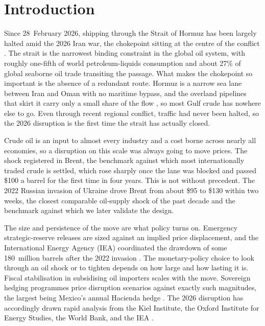 \section{Introduction}
\label{sec:intro}

Since 28~February 2026, shipping through the Strait of Hormuz has been largely halted amid
the 2026 Iran war, the chokepoint sitting at the centre of the conflict
\citep{worldbank2026}. The strait is the narrowest binding constraint in the global
oil system, with roughly one-fifth of world petroleum-liquids consumption
\citep{eia_hormuz2025} and about 27\% of global seaborne oil trade \citep{crs_hormuz2026}
transiting the passage. What makes the
chokepoint so important is the absence of a redundant route. Hormuz is a narrow sea lane
between Iran and Oman with no maritime bypass, and the overland pipelines that skirt it
carry only a small share of the flow \citep{eia_hormuz2025}, so most Gulf crude has nowhere
else to go. Even
through recent regional conflict, traffic had never been halted, so the 2026 disruption is
the first time the strait has actually closed.

Crude oil is an input to almost every industry and a cost borne across nearly all
economies, so a disruption on this scale was always going to move prices. The shock
registered in Brent, the benchmark against which most internationally traded crude is
settled, which rose sharply once the lane was blocked and passed \$100 a barrel for the
first time in four years. This is not without precedent. The 2022 Russian invasion of
Ukraine drove Brent from about \$95 to \$130 within two weeks, the closest comparable
oil-supply shock of the past decade and the benchmark against which we later validate the
design.

The size and persistence of the move are what policy turns on. Emergency
strategic-reserve releases are sized against an implied price displacement, and the
International Energy Agency (IEA) coordinated the drawdown of some 180~million barrels
after the 2022 invasion \citep{iea2022release}. The monetary-policy choice to look through
an oil shock or to tighten depends on how large and how lasting it is. Fiscal
stabilisation in subsidising oil importers scales with the move. Sovereign hedging
programmes price disruption scenarios against exactly such magnitudes, the largest being
Mexico's annual Hacienda hedge \citep{jfi2023mexico}. The 2026 disruption has accordingly
drawn rapid analysis from the Kiel Institute, the Oxford Institute for Energy Studies, the
World Bank, and the IEA \citep{kiel2026,oies2026,worldbank2026,iea2026}.

